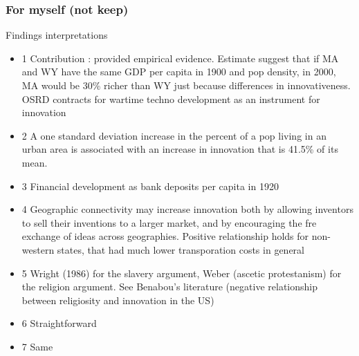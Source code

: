\documentclass[aspectratio=169, 12pt, final]{beamer}
\begin{document}
\begin{frame}
\frametitle{For myself (not keep)}
Findings interpretations
\footnotesize
\begin{itemize}
	\item 1 Contribution : provided empirical evidence. Estimate suggest that if MA and WY have the same GDP per capita in 1900 and pop density, in 2000, MA would be 30\% richer than WY just because differences in innovativeness. OSRD contracts for wartime techno development as an instrument for innovation
	\item 2 A one standard deviation increase in the percent of a pop living in an urban area is associated with an increase in innovation that is 41.5\% of its mean.
	\item 3 Financial development as bank deposits per capita in 1920
	\item 4 Geographic connectivity may increase innovation both by allowing inventors to sell their inventions to a larger market, and by encouraging the fre exchange of ideas across geographies. Positive relationship holds for non-western states, that had much lower transporation costs in general
	\item 5 Wright (1986) for the slavery argument, Weber (ascetic protestanism) for the religion argument. See Benabou's literature (negative relationship between religiosity and innovation in the US)
	\item 6 Straightforward
	\item 7 Same
\end{itemize}
\end{frame}
\end{document}
